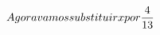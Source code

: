 \documentclass[preview]{standalone}
\begin{document}
\begin{align*}
\special{dvisvgm:raw <g id='unique000'>}Agora vamos substituir x por \frac{4}{13}\special{dvisvgm:raw </g>}
\end{align*}
\end{document}
